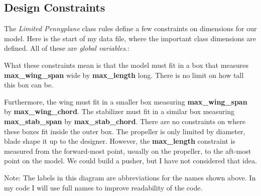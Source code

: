 \subsection{Design Constraints}

The {\it Limited Pennyplane} class rules define a few constraints on dimensions
for our model. Here is the start of my data file, where the important class dimensions are
defined. All of these are {\it global variables}.:


What these constraints mean is that the model must fit in a box that measures {\bf
max\_wing\_span} wide by {\bf max\_length} long. There is no limit on how
tall this box can be.

Furthermore, the wing must fit in a smaller box measuring {\bf max\_wing\_span}
by {\bf max\_wing\_chord}. The stabilizer must fit in a similar box measuring
{\bf max\_stab\_span} by {\bf max\_stab\_chord}. There are no constraints on where
these boxes fit inside the outer box. The propeller is only limited by
diameter, blade shape it up to the designer. However, the {\bf max\_length}
constraint is measured from the forward-most point, usually on the propeller,
to the aft-most point on the model. We could build a pusher, but I have not
considered that idea.


Note: The labels in this diagram are abbreviations for the names shown above.
In my code I will use full names to improve readability of the code.
